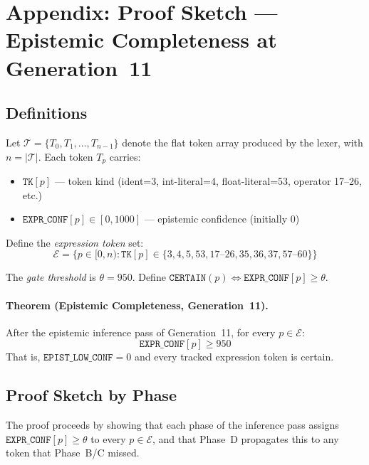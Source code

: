 
\section*{Appendix: Proof Sketch — Epistemic Completeness at Generation~11}
\label{appendix:proof}

\subsection*{Definitions}

Let $\mathcal{T} = \{T_0, T_1, \ldots, T_{n-1}\}$ denote the flat token array
produced by the lexer, with $n = |\mathcal{T}|$.
Each token $T_p$ carries:
\begin{itemize}
\item $\mathtt{TK}[p]$ — token kind (ident=3, int-literal=4, float-literal=53, operator 17--26, etc.)
\item $\mathtt{EXPR\_CONF}[p] \in [0, 1000]$ — epistemic confidence (initially 0)
\end{itemize}

Define the \emph{expression token} set:
\[
  \mathcal{E} = \{p \in [0,n) : \mathtt{TK}[p] \in \{3, 4, 5, 53, 17\text{--}26, 35, 36, 37, 57\text{--}60\}\}
\]

The \emph{gate threshold} is $\theta = 950$.
Define $\mathtt{CERTAIN}(p) \Leftrightarrow \mathtt{EXPR\_CONF}[p] \geq \theta$.

\paragraph{Theorem (Epistemic Completeness, Generation~11).}
After the epistemic inference pass of Generation~11, for every
$p \in \mathcal{E}$:
\[
  \mathtt{EXPR\_CONF}[p] \geq 950
\]
That is, $\mathtt{EPIST\_LOW\_CONF} = 0$ and every tracked expression token is certain.

\subsection*{Proof Sketch by Phase}

The proof proceeds by showing that each phase of the inference pass assigns
$\mathtt{EXPR\_CONF}[p] \geq \theta$ to every $p \in \mathcal{E}$, and that Phase~D
propagates this to any token that Phase~B/C missed.

